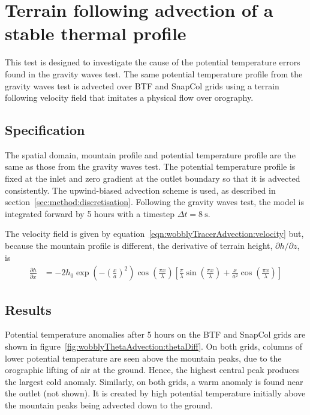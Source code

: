 \section{Terrain following advection of a stable thermal profile}
\label{sec:wobblyThetaAdvection}

This test is designed to investigate the cause of the potential temperature errors found in the gravity waves test.  The same potential temperature profile from the gravity waves test is advected over BTF and SnapCol grids using a terrain following velocity field that imitates a physical flow over orography.

\subsection{Specification}
The spatial domain, mountain profile and potential temperature profile are the same as those from the gravity waves test.  The potential temperature profile is fixed at the inlet and zero gradient at the outlet boundary so that it is advected consistently.  The upwind-biased advection scheme is used, as described in section~\ref{sec:method:discretisation}.  Following the gravity waves test, the model is integrated forward by 5 hours with a timestep $\Delta t = \SI{8}{\second}$. 

The velocity field is given by equation~\ref{eqn:wobblyTracerAdvection:velocity} but, because the mountain profile is different, the derivative of terrain height, $\partial h / \partial z$, is
\begin{align}
\frac{\partial h}{\partial x} &= - 2 h_0 \exp \left( - \left( \frac{x}{a} \right)^2 \right) \cos \left( \frac{\pi x}{\lambda} \right) \left[
\frac{\pi}{\lambda} \sin \left(\frac{\pi x}{\lambda} \right) +
\frac{x}{a^2} \cos \left( \frac{\pi x}{\lambda} \right) \right]
\end{align}

\subsection{Results}
Potential temperature anomalies after 5 hours on the BTF and SnapCol grids are shown in figure~\ref{fig:wobblyThetaAdvection:thetaDiff}.  On both grids, columns of lower potential temperature are seen above the mountain peaks, due to the orographic lifting of air at the ground.  Hence, the highest central peak produces the largest cold anomaly.  Similarly, on both grids, a warm anomaly is found near the outlet (not shown).  It is created by high potential temperature initially above the mountain peaks being advected down to the ground.

